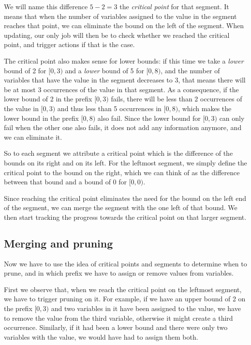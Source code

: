 \documentclass[a4paper,10pt]{article}
\begin{document}
We will name this difference $5-2=3$ the \emph{critical point} for that segment. It means that when the number of variables assigned to the value in the segment reaches that point, we can eliminate the bound on the left of the segment. When updating, our only job will then be to check whether we reached the critical point, and trigger actions if that is the case.

The critical point also makes sense for lower bounds: if this time we take a \emph{lower} bound of 2 for $[0,3)$ and a \emph{lower} bound of 5 for $[0,8)$, and the number of variables that have the value in the segment decreases to 3, that means there will be at most 3 occurrences of the value in that segment. As a consequence, if the lower bound of 2 in the prefix $[0,3)$ fails, there will be less than 2 occurrences of the value in $[0,3)$ and thus less than 5 occurrences in $[0,8)$, which makes the lower bound in the prefix $[0,8)$ also fail. Since the lower bound for $[0,3)$ can only fail when the other one also fails, it does not add any information anymore, and we can eliminate it.

So to each segment we attribute a critical point which is the difference of the bounds on its right and on its left. For the leftmost segment, we simply define the critical point to the bound on the right, which we can think of as the difference between that bound and a bound of 0 for $[0,0)$.

Since reaching the critical point eliminates the need for the bound on the left end of the segment, we can merge the segment with the one left of that bound. We then start tracking the progress towards the critical point on that larger segment.

\subsection{Merging and pruning}
\label{subsec:merging-pruning}

Now we have to use the idea of critical points and segments to determine when to prune, and in which prefix we have to assign or remove values from variables.

First we observe that, when we reach the critical point on the leftmost segment, we have to trigger pruning on it. For example, if we have an upper bound of 2 on the prefix $[0,3)$ and two variables in it have been assigned to the value, we have to remove the value from the third variable, otherwise it might create a third occurrence. Similarly, if it had been a lower bound and there were only two variables with the value, we would have had to assign them both.
\end{document}
